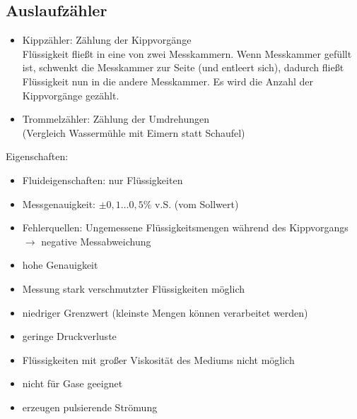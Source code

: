 \subsection{Auslaufzähler}
\begin{itemize}
\item Kippzähler: Zählung der Kippvorgänge\\
Flüssigkeit fließt in eine von zwei Messkammern. Wenn Messkammer gefüllt ist, schwenkt die Messkammer zur Seite (und entleert sich), dadurch fließt Flüssigkeit nun in die andere Messkammer. Es wird die Anzahl der Kippvorgänge gezählt.
\item Trommelzähler: Zählung der Umdrehungen\\
(Vergleich Wassermühle mit Eimern statt Schaufel)
\end{itemize}
Eigenschaften:
\begin{itemize}
\item Fluideigenschaften: nur Flüssigkeiten
\item Messgenauigkeit: $\pm 0,1 \ldots 0,5 \%$ v.S. (vom Sollwert)
\item Fehlerquellen: Ungemessene Flüssigkeitsmengen während des Kippvorgangs $\to$ negative Messabweichung
\end{itemize}
\begin{itemize}[label=$+$]
\item hohe Genauigkeit
\item Messung stark verschmutzter Flüssigkeiten möglich
\item niedriger Grenzwert (kleinste Mengen können verarbeitet werden)
\item geringe Druckverluste
\end{itemize}
\begin{itemize}[label=$-$]
\item Flüssigkeiten mit großer Viskosität des Mediums nicht möglich
\item nicht für Gase geeignet
\item erzeugen pulsierende Strömung
\end{itemize}
